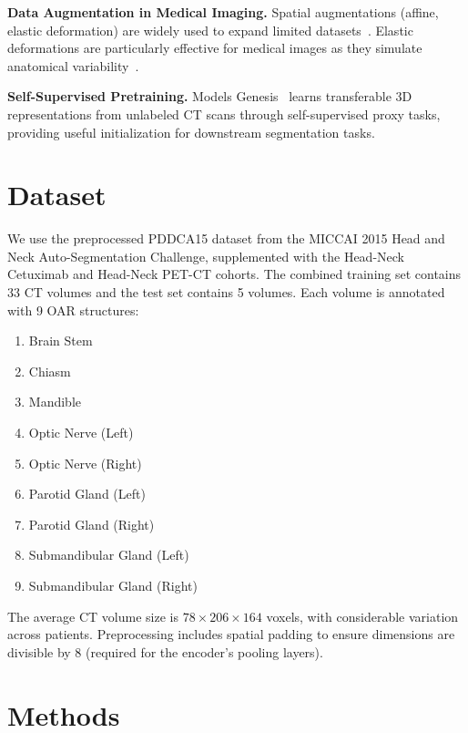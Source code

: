 \documentclass[10pt,twocolumn]{article}
\begin{document}
\textbf{Data Augmentation in Medical Imaging.}
Spatial augmentations (affine, elastic deformation) are widely used to expand limited datasets~\cite{perez2017effectiveness}. Elastic deformations are particularly effective for medical images as they simulate anatomical variability~\cite{simard2003best}.

\textbf{Self-Supervised Pretraining.}
Models Genesis~\cite{zhou2021models} learns transferable 3D representations from unlabeled CT scans through self-supervised proxy tasks, providing useful initialization for downstream segmentation tasks.

\section{Dataset}
\label{sec:dataset}

We use the preprocessed PDDCA15 dataset from the MICCAI 2015 Head and Neck Auto-Segmentation Challenge, supplemented with the Head-Neck Cetuximab and Head-Neck PET-CT cohorts. The combined training set contains 33 CT volumes and the test set contains 5 volumes. Each volume is annotated with 9 OAR structures:

\begin{enumerate}[leftmargin=*]
    \item Brain Stem
    \item Chiasm
    \item Mandible
    \item Optic Nerve (Left)
    \item Optic Nerve (Right)
    \item Parotid Gland (Left)
    \item Parotid Gland (Right)
    \item Submandibular Gland (Left)
    \item Submandibular Gland (Right)
\end{enumerate}

The average CT volume size is $78 \times 206 \times 164$ voxels, with considerable variation across patients. Preprocessing includes spatial padding to ensure dimensions are divisible by 8 (required for the encoder's pooling layers).

\section{Methods}
\label{sec:methods}
\end{document}
